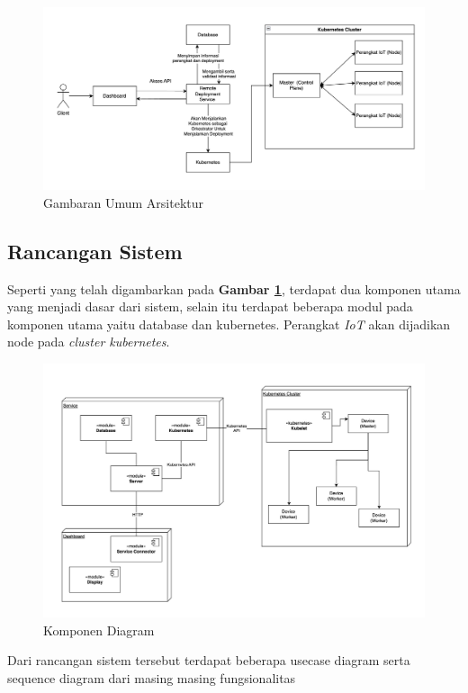\begin{figure}[h]
  \centering
  \includegraphics[width=1\textwidth]{resources/chapter-3/gambaran-umum-arsitektur-updated.jpg}
  \caption{Gambaran Umum Arsitektur}
  \label{fig:gambaran-umum-arsitektur}
\end{figure}

\pagebreak





\subsection{Rancangan Sistem}
Seperti yang telah digambarkan pada \textbf{Gambar \ref{fig:gambaran-umum-arsitektur}}, terdapat dua komponen utama yang menjadi dasar dari sistem, selain itu terdapat beberapa modul pada komponen utama yaitu database dan kubernetes. Perangkat \textit{IoT} akan dijadikan node pada \textit{cluster kubernetes}.

\begin{figure}[h]
  \centering
  \includegraphics[width=1\textwidth]{resources/chapter-3/package-diagram.jpg}
  \caption{Komponen Diagram}
  \label{fig:komponen-diagram}
\end{figure}

Dari rancangan sistem tersebut terdapat beberapa usecase diagram serta sequence diagram dari masing masing fungsionalitas

